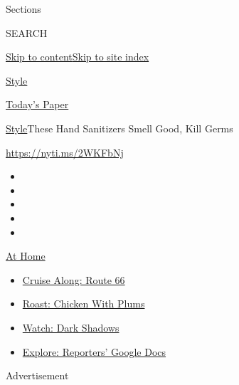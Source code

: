 Sections

SEARCH

\protect\hyperlink{site-content}{Skip to
content}\protect\hyperlink{site-index}{Skip to site index}

\href{https://www.nytimes3xbfgragh.onion/section/style}{Style}

\href{https://myaccount.nytimes3xbfgragh.onion/auth/login?response_type=cookie\&client_id=vi}{}

\href{https://www.nytimes3xbfgragh.onion/section/todayspaper}{Today's
Paper}

\href{/section/style}{Style}\textbar{}These Hand Sanitizers Smell Good,
Kill Germs

\url{https://nyti.ms/2WKFbNj}

\begin{itemize}
\item
\item
\item
\item
\item
\end{itemize}

\href{https://www.nytimes3xbfgragh.onion/spotlight/at-home?action=click\&pgtype=Article\&state=default\&region=TOP_BANNER\&context=at_home_menu}{At
Home}

\begin{itemize}
\tightlist
\item
  \href{https://www.nytimes3xbfgragh.onion/2020/09/07/travel/route-66.html?action=click\&pgtype=Article\&state=default\&region=TOP_BANNER\&context=at_home_menu}{Cruise
  Along: Route 66}
\item
  \href{https://www.nytimes3xbfgragh.onion/2020/09/04/dining/sheet-pan-chicken.html?action=click\&pgtype=Article\&state=default\&region=TOP_BANNER\&context=at_home_menu}{Roast:
  Chicken With Plums}
\item
  \href{https://www.nytimes3xbfgragh.onion/2020/09/04/arts/television/dark-shadows-stream.html?action=click\&pgtype=Article\&state=default\&region=TOP_BANNER\&context=at_home_menu}{Watch:
  Dark Shadows}
\item
  \href{https://www.nytimes3xbfgragh.onion/interactive/2020/at-home/even-more-reporters-editors-diaries-lists-recommendations.html?action=click\&pgtype=Article\&state=default\&region=TOP_BANNER\&context=at_home_menu}{Explore:
  Reporters' Google Docs}
\end{itemize}

Advertisement

